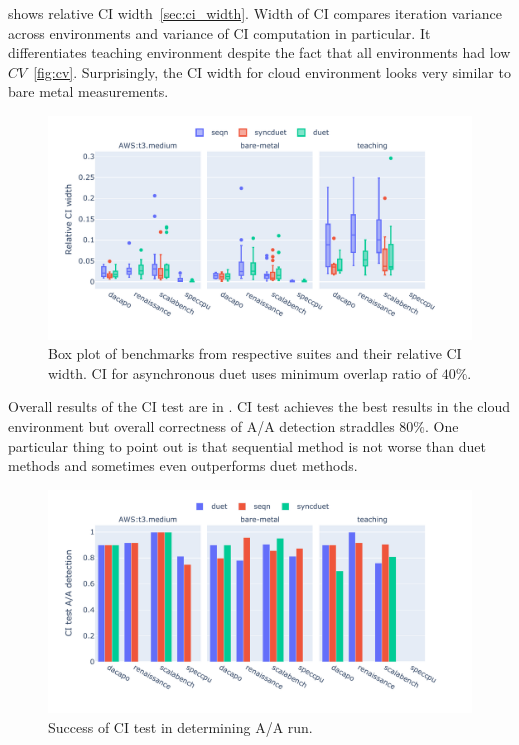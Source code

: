  shows relative CI width~\ref{sec:ci_width}.
Width of CI compares iteration variance across environments and variance of CI computation in particular.
It differentiates teaching environment despite the fact that all environments had low $CV$~\ref{fig:cv}.
Surprisingly, the CI width for cloud environment looks very similar to bare metal measurements.

\begin{figure}
	\centering
	\includegraphics[width=1\linewidth]{./figures/ci_width.pdf}
	\caption{
		Box plot of benchmarks from respective suites and their relative CI width. 
		CI for asynchronous duet uses minimum overlap ratio of $40\%$.
	}
	\label{fig:suite_cv}
\end{figure}

Overall results of the CI test are in .
CI test achieves the best results in the cloud environment but overall correctness of A/A detection straddles $80\%$.
One particular thing to point out is that sequential method is not worse than duet methods and sometimes even outperforms duet methods.

\begin{figure}
	\centering
	\includegraphics[width=1\linewidth]{./figures/citest_aa_match.pdf}
	\caption{
		Success of CI test in determining A/A run.
	}
	\label{fig:citest_aa}
\end{figure}

